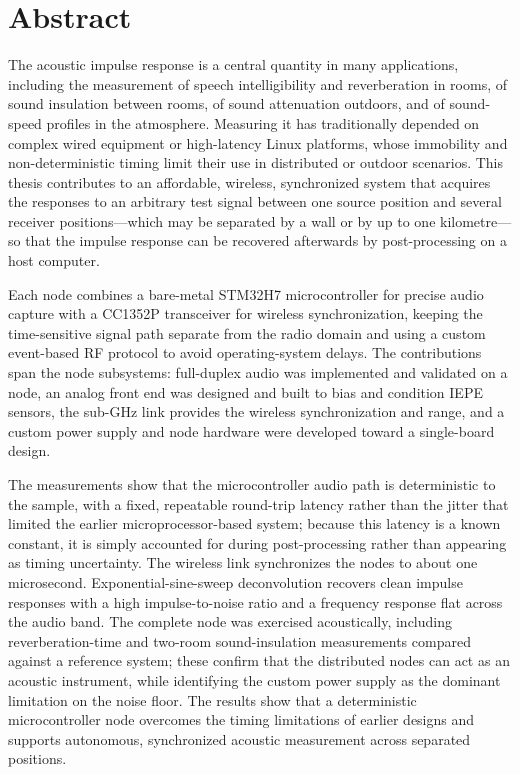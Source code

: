 \chapter*{Abstract}

The acoustic impulse response is a central quantity in many applications, including the measurement of speech intelligibility and reverberation in rooms, of sound insulation between rooms, of sound attenuation outdoors, and of sound-speed profiles in the atmosphere. Measuring it has traditionally depended on complex wired equipment or high-latency Linux platforms, whose immobility and non-deterministic timing limit their use in distributed or outdoor scenarios. This thesis contributes to an affordable, wireless, synchronized system that acquires the responses to an arbitrary test signal between one source position and several receiver positions---which may be separated by a wall or by up to one kilometre---so that the impulse response can be recovered afterwards by post-processing on a host computer.

Each node combines a bare-metal STM32H7 microcontroller for precise audio capture with a CC1352P transceiver for wireless synchronization, keeping the time-sensitive signal path separate from the radio domain and using a custom event-based RF protocol to avoid operating-system delays. The contributions span the node subsystems: full-duplex audio was implemented and validated on a node, an analog front end was designed and built to bias and condition IEPE sensors, the sub-GHz link provides the wireless synchronization and range, and a custom power supply and node hardware were developed toward a single-board design.

The measurements show that the microcontroller audio path is deterministic to the sample, with a fixed, repeatable round-trip latency rather than the jitter that limited the earlier microprocessor-based system; because this latency is a known constant, it is simply accounted for during post-processing rather than appearing as timing uncertainty. The wireless link synchronizes the nodes to about one microsecond. Exponential-sine-sweep deconvolution recovers clean impulse responses with a high impulse-to-noise ratio and a frequency response flat across the audio band. The complete node was exercised acoustically, including reverberation-time and two-room sound-insulation measurements compared against a reference system; these confirm that the distributed nodes can act as an acoustic instrument, while identifying the custom power supply as the dominant limitation on the noise floor. The results show that a deterministic microcontroller node overcomes the timing limitations of earlier designs and supports autonomous, synchronized acoustic measurement across separated positions.